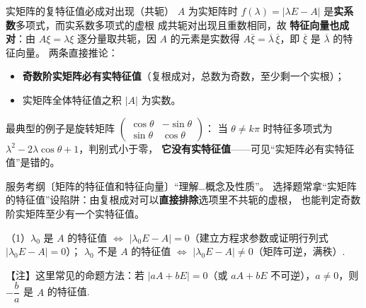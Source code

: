 \begin{fdeep}{实矩阵的复特征值必成对出现（共轭）}
$A$ 为实矩阵时 $f(\lambda)=\lvert\lambda E-A\rvert$ 是\textbf{实系数}多项式，而实系数多项式的虚根
成共轭对出现且重数相同，故
\textbf{特征向量也成对}：由 $A\xi=\lambda\xi$ 逐分量取共轭，因 $A$ 的元素是实数得
$A\overline{\xi}=\overline{\lambda}\,\overline{\xi}$，即 $\overline{\xi}$ 是 $\overline{\lambda}$ 的特征向量。
两条直接推论：
\begin{itemize}[leftmargin=2.2em,itemsep=0.22em]
\item \textbf{奇数阶实矩阵必有实特征值}（复根成对，总数为奇数，至少剩一个实根）；
\item 实矩阵全体特征值之积 $\lvert A\rvert$ 为实数。
\end{itemize}
最典型的例子是旋转矩阵 $\begin{pmatrix}\cos\theta&-\sin\theta\\ \sin\theta&\cos\theta\end{pmatrix}$：
当 $\theta\ne k\pi$ 时特征多项式为 $\lambda^{2}-2\lambda\cos\theta+1$，判别式小于零，
\textbf{它没有实特征值}——可见“实矩阵必有实特征值”是错的。

\fbref{}服务考纲〔矩阵的特征值和特征向量〕“理解…概念及性质”。
选择题常拿“实矩阵的特征值”设陷阱：由复根成对可以\textbf{直接排除}选项里不共轭的虚根，
也能判定奇数阶实矩阵至少有一个实特征值。
\end{fdeep}



（1）$\lambda_0$ 是 $A$ 的特征值 $\iff$ $|\lambda_0E-A|=0$（建立方程求参数或证明行列式 $|\lambda_0E-A|=0$）；
$\lambda_0$ 不是 $A$ 的特征值 $\iff$ $|\lambda_0E-A|\ne0$（矩阵可逆，满秩）.


\begin{fnote}
【注】这里常见的命题方法：若 $|aA+bE|=0$（或 $aA+bE$ 不可逆），$a\ne0$，则 $-\dfrac{b}{a}$ 是 $A$ 的特征值.
\end{fnote}


